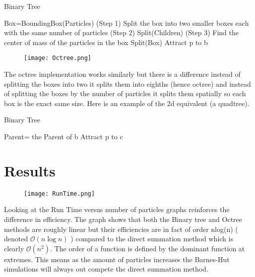 \documentclass[11pt]{article}
\begin{document}
\begin{algorithm}
    \caption{Binary Tree} 
	\begin{algorithmic}[1]
	\State Box=BoundingBox(Particles) (Step 1)
	\State Split the box into two smaller boxes each with the same number of particles (Step 2)
	\State Split(Children) (Step 3)
	\State Find the center of mass of the particles in the box 
	\EndFunction
	\State Split(Box)
		        \State Attract p to b
		    \EndIf
			\EndFor
		\EndFor
	\end{algorithmic} 
\end{algorithm}
\vspace{40mm} %

\begin{figure}[h]
\begin{center}
\texttt{[image: Octree.png]}
\end{center}
\caption{
}
\label{setup}
\end{figure}

The octree implementation works similarly but there is a difference instead of splitting the boxes into two it splits them into eighths (hence octree) and instead of splitting the boxes by the number of particles it splits them spatially so each box is the exact same size. 
Here is an example of the 2d equivalent (a quadtree).

\begin{algorithm}
    \caption{Binary Tree} 
	\begin{algorithmic}[1]
			Parent= the Parent of b
		        \State Attract p to c
		    \EndIf
			\EndFor
			\EndFor
		\EndFor
	\end{algorithmic} 
\end{algorithm}
\vspace{50mm} %


\section{Results}

\begin{figure}[h]
\begin{center}
\texttt{[image: RunTime.png]}
\end{center}
\caption{
}
\label{setup}
\end{figure}
Looking at the Run Time versus number of particles graphs reinforces the difference in efficiency. The graph shows that both the Binary tree and Octree methods are roughly linear but their efficiencies are in fact of order nlog(n) ( denoted $\mathcal{O}(n\log{}n)$ ) compared to the direct summation method which is clearly $\mathcal{O}(n^2)$. The order of a function is defined by the dominant function at extremes. This means as the amount of particles increases the Barnes-Hut simulations will always out compete the direct summation method.
\end{document}
